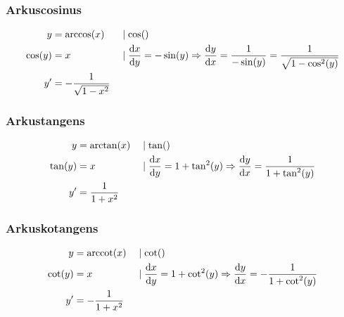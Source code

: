 \subsubsection{Arkuscosinus}

\begin{align*}
    y &= \arccos(x) &&\mid \cos() \\
    \cos(y) &= x &&\mid \frac{\mathop{}\!\mathrm{d} x}{\mathop{}\!\mathrm{d} y} = -\sin(y) \Rightarrow \frac{\mathop{}\!\mathrm{d} y}{\mathop{}\!\mathrm{d} x} = \frac{1}{-\sin(y)} = \frac{1}{\sqrt{1 - \cos^2(y)}} \\
    y' &= -\frac{1}{\sqrt{1 - x^2}} 
\end{align*}

\subsubsection{Arkustangens}

\begin{align*}
    y &= \arctan(x) &&\mid \tan() \\
    \tan(y) &= x &&\mid \frac{\mathop{}\!\mathrm{d} x}{\mathop{}\!\mathrm{d} y} = 1 + \tan^2(y) \Rightarrow \frac{\mathop{}\!\mathrm{d} y}{\mathop{}\!\mathrm{d} x} = \frac{1}{1 + \tan^2(y)} \\
    y' &= \frac{1}{1 + x^2}
\end{align*}

\subsubsection{Arkuskotangens}

\begin{align*}
    y &= \operatorname{arccot}(x) &&\mid \cot() \\
    \cot(y) &= x &&\mid \frac{\mathop{}\!\mathrm{d} x}{\mathop{}\!\mathrm{d} y} = 1 + \cot^2(y) \Rightarrow \frac{\mathop{}\!\mathrm{d} y}{\mathop{}\!\mathrm{d} x} = -\frac{1}{1 + \cot^2(y)} \\
    y' &= -\frac{1}{1 + x^2}
\end{align*}

